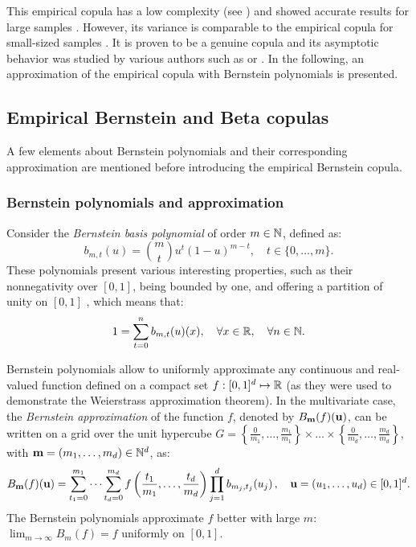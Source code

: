 This empirical copula has a low complexity (see \citealp{rose_2015}) and showed accurate results for large samples \citep{gonzalez_2021_checkerboard_copula}. 
However, its variance is comparable to the empirical copula for small-sized samples \citep{segers_2017}. 
It is proven to be a genuine copula and its asymptotic behavior was studied by various authors such as \citet{li_1998_checkerboard} or \citet{genest_2017_asymptotic_checkerboard}. 
In the following, an approximation of the empirical copula with Bernstein polynomials is presented. 



\subsection{Empirical Bernstein and Beta copulas}\label{sec:3ebc}
A few elements about Bernstein polynomials and their corresponding approximation are mentioned before introducing the empirical Bernstein copula.

\subsubsection{Bernstein polynomials and approximation}
Consider the \textit{Bernstein basis polynomial} of order $m \in \mathbb{N}$, defined as: 
\begin{equation}
    b_{m, t}(u)= \binom{m}{t}u^t(1-u)^{m-t}, \quad t \in \{0, \dots, m\}.
\end{equation}
These polynomials present various interesting properties, such as their nonnegativity over $[0, 1]$, being bounded by one, and offering a partition of unity on $[0, 1]$ \citep{lasserre_2023_bernstein}, which means that: 
\begin{equation}
    1 = \sum_{t=0}^{n} b_{m, t}(u)(x), \quad \forall x\in\mathbb{R}, \quad \forall n \in \mathbb{N}.
\end{equation} 

Bernstein polynomials allow to uniformly approximate any continuous and real-valued function defined on a compact set $f: [0, 1]^d \mapsto \mathbb{R}$ (as they were used to demonstrate the Weierstrass approximation theorem). 
In the multivariate case, the \textit{Bernstein approximation} of the function $f$, denoted by $B_{{\bf m}}(f)({\bf u})$, can be written on a grid over the unit hypercube $G=\left\{\frac{0}{m_1}, \dots, \frac{m_1}{m_1}\right\} \times \dots \times \left\{\frac{0}{m_d}, \dots, \frac{m_d}{m_d}\right\}$, with ${\bf m} = (m_1, \dots, m_d) \in \mathbb{N}^d$, as: 
\begin{equation}
    B_{{\bf m}}(f)({\bf u}) = \sum_{t_1=0}^{m_1} \dots \sum_{t_d=0}^{m_d} f\left(\frac{t_1}{m_1}, \dots, \frac{t_d}{m_d}\right) \prod_{j=1}^d b_{m_j, t_j}(u_j) \, , \quad  {\bf u} = (u_1, \dots, u_d) \in [0, 1]^d.
    \label{eq:bernstein_approx}
\end{equation}
The Bernstein polynomials approximate $f$ better with large $m$: $\lim_{m\to\infty} B_{m}(f) = f$ uniformly on $\left[0,1\right]$. 


